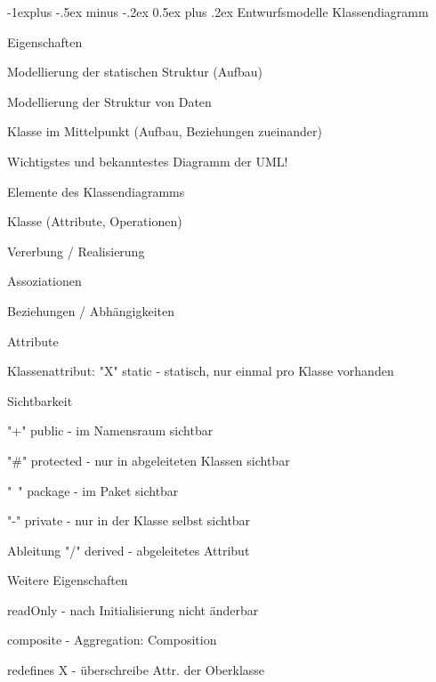 \documentclass[a4paper]{article}
\makeatletter
\renewcommand{\subsection}{\@startsection{subsection}{2}{0mm}%
                                {-1explus -.5ex minus -.2ex}%
                                {0.5ex plus .2ex}%
                                {\normalfont\normalsize\bfseries}}
\makeatother
\begin{document}
\begin{multicols}{3}
  \subsection{Entwurfsmodelle}
  Klassendiagramm
  \begin{itemize*}
    \item Eigenschaften
    \begin{itemize*}
      \item Modellierung der statischen Struktur (Aufbau)
      \item Modellierung der Struktur von Daten
      \item Klasse im Mittelpunkt (Aufbau, Beziehungen zueinander)
      \item Wichtigstes und bekanntestes Diagramm der UML!
    \end{itemize*}
    \item Elemente des Klassendiagramms
    \begin{itemize*}
      \item Klasse (Attribute, Operationen)
      \item Vererbung / Realisierung
      \item Assoziationen
      \item Beziehungen / Abhängigkeiten
    \end{itemize*}
    \item Attribute
    \begin{itemize*}
      \item Klassenattribut: "X" static - statisch, nur einmal pro Klasse vorhanden
      \item Sichtbarkeit
      \item "+" public - im Namensraum sichtbar
      \item "\#" protected - nur in abgeleiteten Klassen sichtbar
      \item "~" package - im Paket sichtbar
      \item "-" private - nur in der Klasse selbst sichtbar
      \item Ableitung "/" derived - abgeleitetes Attribut
    \end{itemize*}
    \item Weitere Eigenschaften
    \begin{itemize*}
      \item readOnly - nach Initialisierung nicht änderbar
      \item composite - Aggregation: Composition
      \item redefines X - überschreibe Attr. der Oberklasse

\end{itemize*}
\end{itemize*}
\end{multicols}
\end{document}

